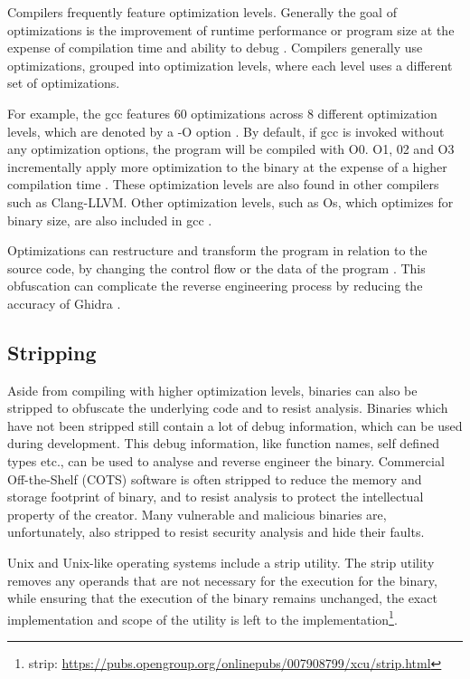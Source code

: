Compilers frequently feature optimization levels. Generally the goal of optimizations is the improvement of runtime performance or program size at the expense of compilation time and ability to debug \cite{ColeOptimizationLevel}. Compilers generally use optimizations, grouped into optimization levels, where each level uses a different set of optimizations.

For example, the gcc features 60 optimizations across 8 different optimization levels, which are denoted by a -O option \cite{ColeOptimizationLevel, gccOptimization}. By default, if gcc is invoked without any optimization options, the program will be compiled with O0. O1, 02 and O3 incrementally apply more optimization to the binary at the expense of a higher compilation time \cite{gccOptimization}. These optimization levels are also found in other compilers such as Clang-LLVM. Other optimization levels, such as Os, which optimizes for binary size, are also included in gcc \cite{gccOptimization}.

Optimizations can restructure and transform the program in relation to the source code, by changing the control flow or the data of the program \cite{optimizationObfuscation}. This obfuscation can complicate the reverse engineering process by reducing the accuracy of Ghidra \cite{optimizationObfuscation}.  

\subsection{Stripping}
Aside from compiling with higher optimization levels, binaries can also be stripped to obfuscate the underlying code and to resist analysis\cite{StochFuzz}. Binaries which have not been stripped still contain a lot of debug information, which can be used during development. This debug information, like function names, self defined types etc., can be used to analyse and reverse engineer the binary. Commercial Off-the-Shelf (COTS) software is often stripped to reduce the memory and storage footprint of binary, and to resist analysis to protect the intellectual property of the creator. Many vulnerable and malicious binaries are, unfortunately, also stripped to resist security analysis and hide their faults\cite{Debin}.

Unix and Unix-like operating systems include a strip utility. The strip utility removes any operands that are not necessary for the execution for the binary, while ensuring that the execution of the binary remains unchanged, the exact implementation and scope of the utility is left to the implementation\footnote{strip: \url{https://pubs.opengroup.org/onlinepubs/007908799/xcu/strip.html}}. 

